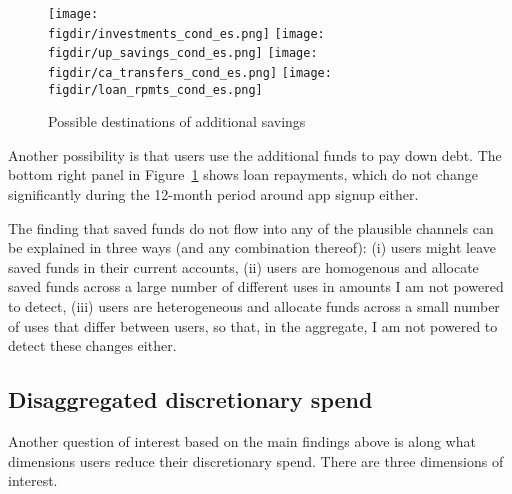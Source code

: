 \begin{figure}[h]
    \centering
    \caption{Possible destinations of additional savings}%
    \label{fig:wdmg}
    \texttt{[image: \\figdir/investments\_cond\_es.png]}
    \texttt{[image: \\figdir/up\_savings\_cond\_es.png]}
    \texttt{[image: \\figdir/ca\_transfers\_cond\_es.png]}
    \texttt{[image: \\figdir/loan\_rpmts\_cond\_es.png]}
\end{figure}

Another possibility is that users use the additional funds to pay down debt.
The bottom right panel in Figure~\ref{fig:wdmg} shows loan repayments, which do
not change significantly during the 12-month period around app signup either.

The finding that saved funds do not flow into any of the plausible channels can
be explained in three ways (and any combination thereof): (i) users might leave
saved funds in their current accounts, (ii) users are homogenous and allocate
saved funds across a large number of different uses in amounts I am not powered
to detect, (iii) users are heterogeneous and allocate funds across a small
number of uses that differ between users, so that, in the aggregate, I am not
powered to detect these changes either.


\subsection{Disaggregated discretionary spend}%
\label{sub:disaggregated_discretionary_spend}

Another question of interest based on the main findings above is along what
dimensions users reduce their discretionary spend. There are three dimensions of
interest.

